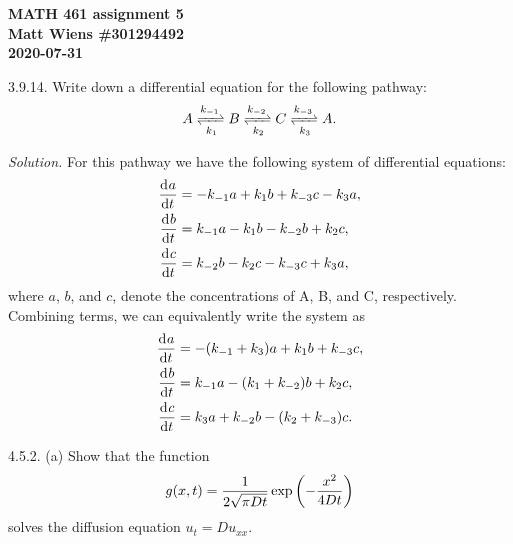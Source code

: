 \documentclass{article}
\begin{document}
\textbf{MATH 461 assignment 5} \\
\textbf{Matt Wiens \#301294492} \\
\textbf{2020-07-31}

3.9.14. Write down a differential equation for the following pathway:
%
\begin{equation*}
    A \xrightleftharpoons[k_1]{k_{-1}}
    B \xrightleftharpoons[k_2]{k_{-2}}
    C \xrightleftharpoons[k_3]{k_{-3}}
    A
    .
\end{equation*}

\textit{Solution.}
For this pathway we have the following system of differential equations:
%
\begin{align*}
    \dod{a}{t} &= - k_{-1} a + k_1 b + k_{-3} c - k_3 a
    , \\
    \dod{b}{t} &= k_{-1} a - k_1 b - k_{-2} b + k_2 c
    , \\
    \dod{c}{t} &= k_{-2} b - k_2 c - k_{-3} c + k_3 a
    ,
\end{align*}
%
where $a$, $b$, and $c$, denote the concentrations of A, B, and C, respectively.
Combining terms, we can equivalently write the system as
%
\begin{align*}
    \dod{a}{t} &= - (k_{-1} + k_3) a + k_1 b + k_{-3} c
    , \\
    \dod{b}{t} &= k_{-1} a - (k_1 + k_{-2}) b + k_2 c
    , \\
    \dod{c}{t} &= k_3 a + k_{-2} b - (k_2 + k_{-3}) c
    .
\end{align*}

\newpage

4.5.2. (a) Show that the function
%
\begin{equation*}
    g(x, t) = \frac{1}{2 \sqrt{\pi D t}} \exp \del[3]{- \frac{x^2}{4 D t}}
\end{equation*}
%
solves the diffusion equation $u_t = D u_{x x}$.
\end{document}
